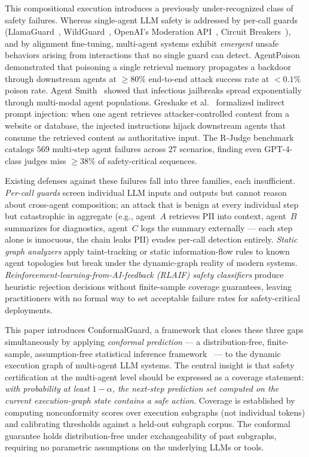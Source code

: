 \documentclass[12pt,a4paper]{article}
\theoremstyle{definition}
\theoremstyle{remark}
\newcommand{\modelname}{ConformalGuard}
\begin{document}
This compositional execution introduces a previously under-recognized class of safety failures. Whereas single-agent LLM safety is addressed by per-call guards (LlamaGuard~\cite{inan2023llamaguard}, WildGuard~\cite{han2024wildguard}, OpenAI's Moderation API~\cite{openai2023moderation}, Circuit Breakers~\cite{zou2024circuit}), and by alignment fine-tuning, multi-agent systems exhibit \emph{emergent} unsafe behaviors arising from interactions that no single guard can detect. AgentPoison~\cite{chen2024agentpoison} demonstrated that poisoning a single retrieval memory propagates a backdoor through downstream agents at $\geq 80\%$ end-to-end attack success rate at $<0.1\%$ poison rate. Agent Smith~\cite{gu2024agentsmith} showed that infectious jailbreaks spread exponentially through multi-modal agent populations. Greshake et al.~\cite{greshake2023indirect} formalized indirect prompt injection: when one agent retrieves attacker-controlled content from a website or database, the injected instructions hijack downstream agents that consume the retrieved content as authoritative input. The R-Judge benchmark~\cite{yuan2024rjudge} catalogs $569$ multi-step agent failures across $27$ scenarios, finding even GPT-4-class judges miss $\geq 38\%$ of safety-critical sequences.

Existing defenses against these failures fall into three families, each insufficient. \emph{Per-call guards} screen individual LLM inputs and outputs but cannot reason about cross-agent composition; an attack that is benign at every individual step but catastrophic in aggregate (e.g., agent~$A$ retrieves PII into context, agent~$B$ summarizes for diagnostics, agent~$C$ logs the summary externally --- each step alone is innocuous, the chain leaks PII) evades per-call detection entirely. \emph{Static graph analyzers} apply taint-tracking or static information-flow rules to known agent topologies but break under the dynamic-graph reality of modern systems. \emph{Reinforcement-learning-from-AI-feedback (RLAIF) safety classifiers} produce heuristic rejection decisions without finite-sample coverage guarantees, leaving practitioners with no formal way to set acceptable failure rates for safety-critical deployments.

This paper introduces \modelname{}, a framework that closes these three gaps simultaneously by applying \emph{conformal prediction} --- a distribution-free, finite-sample, assumption-free statistical inference framework~\cite{vovk2005algorithmic,angelopoulos2021gentle} --- to the dynamic execution graph of multi-agent LLM systems. The central insight is that safety certification at the multi-agent level should be expressed as a coverage statement: \emph{with probability at least $1-\alpha$, the next-step prediction set computed on the current execution-graph state contains a safe action}. Coverage is established by computing nonconformity scores over execution subgraphs (not individual tokens) and calibrating thresholds against a held-out subgraph corpus. The conformal guarantee holds distribution-free under exchangeability of past subgraphs, requiring no parametric assumptions on the underlying LLMs or tools.
\end{document}
